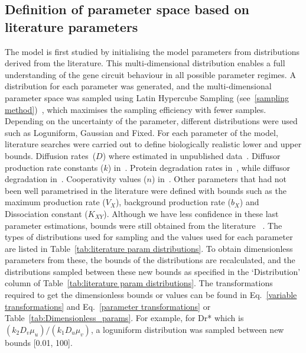 \subsection{Definition of parameter space based on literature parameters}\label{Definition of parameter space based on literature parametrisation}
The model is first studied by initialising the model parameters from distributions derived from the literature.
This multi-dimensional distribution enables a full understanding of the gene circuit behaviour in all possible parameter regimes.
A distribution for each parameter was generated,
and the multi-dimensional parameter space was sampled using Latin Hypercube Sampling
(see~\ref{sampling method})~\parencite{Iman2014, Bergstra2012},
which maximises the sampling efficiency with fewer samples.
Depending on the uncertainty of the parameter, different distributions were used such as Loguniform, Gaussian and Fixed.
 For each parameter of the model,
literature searches were carried out to define biologically realistic lower and upper bounds.
Diffusion rates~($D$) where estimated in unpublished data~\parencite{tica_diffusers}.
Diffusor production rate constants ($k$) in~\cite{Schaefer1996, Pai2009}.
Protein degradation rates in~\cite{Andersen1998}, while diffusor degradation in~\cite{kaufmann2005revisiting}.
Cooperativity values ($n$) in~\cite{Babic2007}.
Other parameters that had not been well parametrised in the literature were defined with bounds such as the maximum production rate
($V_{X}$),
background production rate ($b_{X}$) and Dissociation constant
($K_{XY}$).
Although we have less confidence in these last parameter estimations,
bounds were still obtained from the literature ~\parencite{Scholes2019, Pusnik2019}.
The types of distributions
used for sampling and the values used for each parameter are listed in Table~\ref{tab:literature param distributions}.
To obtain dimensionless parameters from these, the bounds of the distributions are recalculated,
and the distributions sampled between these new bounds as specified in the ‘Distribution’
column of Table~\ref{tab:literature param distributions}.
The transformations
required to get the dimensionless bounds or values can be found in Eq.~\ref{variable transformations} and Eq.~\ref{parameter transformations} or Table~\ref{tab:Dimensionless_params}.
For example, for Dr* which is $(k_{2}D_{v}\mu_{u})/(k_{1}D_{u}\mu_{v})$,
a loguniform distribution was sampled between new bounds [0.01, 100].
